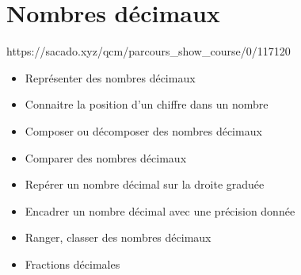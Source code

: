  
\chapter{Nombres décimaux}
{https://sacado.xyz/qcm/parcours_show_course/0/117120}
{ 

 \begin{CpsCol}
{\LARGE \textbf{\color{sacado_violet}{Les savoir faire ciblés}}}
 \begin{itemize}[leftmargin=*]
 \item Représenter des nombres décimaux 
 \item Connaitre la position d'un chiffre dans un nombre
 \item Composer ou décomposer des nombres décimaux  
 \item Comparer des nombres décimaux  
 \item Repérer un nombre décimal sur la droite graduée
 \item Encadrer un nombre décimal avec une précision donnée
 \item Ranger, classer des nombres décimaux 
 \end{itemize}
 \end{CpsCol}


\begin{CCon}
{\LARGE \textbf{\color{sacado_violet}{Chapitres connexes spiralés}}}
\begin{itemize}[leftmargin=*]
\item Fractions décimales   
\end{itemize}
\end{CCon}

}
%
%
% 
%
% 
%




